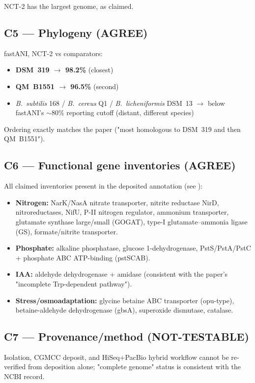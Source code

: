 \documentclass[11pt]{article}
\begin{document}
NCT-2 has the largest genome, as claimed.

\subsection*{C5 --- Phylogeny (AGREE)}
fastANI, NCT-2 vs comparators:
\begin{itemize}
\item \textbf{DSM~319 $\rightarrow$ 98.2\%} (closest) \checkmark
\item \textbf{QM~B1551 $\rightarrow$ 96.5\%} (second) \checkmark
\item \emph{B.~subtilis} 168 / \emph{B.~cereus} Q1 / \emph{B.~licheniformis} DSM~13 $\rightarrow$ below fastANI's $\sim$80\% reporting cutoff (distant, different species) \checkmark
\end{itemize}
Ordering exactly matches the paper ("most homologous to DSM~319 and then QM~B1551").

\subsection*{C6 --- Functional gene inventories (AGREE)}
All claimed inventories present in the deposited annotation (see ):
\begin{itemize}
\item \textbf{Nitrogen:} NarK/NasA nitrate transporter, nitrite reductase NirD, nitroreductases, NifU, P-II nitrogen regulator, ammonium transporter, glutamate synthase large/small (GOGAT), type-I glutamate--ammonia ligase (GS), formate/nitrite transporter.
\item \textbf{Phosphate:} alkaline phosphatase, glucose 1-dehydrogenase, PstS/PstA/PstC + phosphate ABC ATP-binding (pstSCAB).
\item \textbf{IAA:} aldehyde dehydrogenase + amidase (consistent with the paper's "incomplete Trp-dependent pathway").
\item \textbf{Stress/osmoadaptation:} glycine betaine ABC transporter (opu-type), betaine-aldehyde dehydrogenase (gbsA), superoxide dismutase, catalase.
\end{itemize}

\subsection*{C7 --- Provenance/method (NOT-TESTABLE)}
Isolation, CGMCC deposit, and HiSeq+PacBio hybrid workflow cannot be re-verified from deposition alone; "complete genome" status is consistent with the NCBI record.
\end{document}
